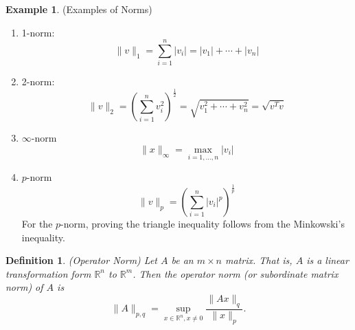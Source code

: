 \documentclass[12pt]{article}
\newtheorem{definition}{Definition}
\theoremstyle{definition}
\newtheorem{example}{Example}
\newcommand{\R}{\mathbb{R}}
\newcommand{\norm}[1]{\lVert#1\rVert}
\begin{document}
\begin{example}(Examples of Norms)
\begin{enumerate}
	\item 1-norm:
	\begin{equation}
		\norm{v}_1 = \sum_{i=1}^n |v_i| = |v_1| + \cdots + |v_n|
	\end{equation}
	\item 2-norm:
	\begin{equation}
		\norm{v}_2 = \left( \sum_{i=1}^n v_i^2 \right)^{\frac{1}{2}} = \sqrt{v_1^2 + \cdots + v_n^2} = \sqrt{v^T v}
	\end{equation}
	\item $\infty$-norm
	\begin{equation}
		\norm{x}_{\infty} = \max_{i=1, \ldots, n} |v_i|
	\end{equation}
	\item $p$-norm
	\begin{equation}
		\norm{v}_p = \left( \sum_{i=1}^n |v_i|^p \right)^{\frac{1}{p}}
	\end{equation}
	For the $p$-norm, proving the triangle inequality follows from the Minkowski's inequality.
\end{enumerate}
\end{example}

\begin{definition}(Operator Norm)
Let $A$ be an $m \times n$ matrix. That is, $A$ is a linear transformation form $\R^n$ to $\R^m$. Then the operator norm (or subordinate matrix norm) of $A$ is
\begin{equation}
	\norm{A}_{p,q} = \sup_{x \in \R^n, x\neq 0} \frac{\norm{Ax}_q}{\norm{x}_p}.
\end{equation}
\end{definition}
\end{document}
